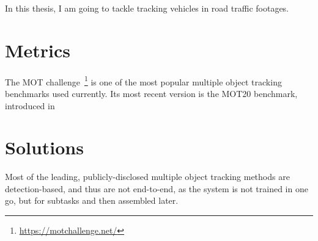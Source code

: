 In this thesis, I am going to tackle tracking vehicles in road traffic footages.

\section{Metrics}

The MOT challenge~\footnote{\url{https://motchallenge.net/}} is one of the most popular multiple object tracking  benchmarks used currently. Its most recent version is the MOT20 benchmark, introduced in   

\section{Solutions}

Most of the leading, publicly-disclosed multiple object tracking methods are detection-based, and thus are not end-to-end, as the system is not trained in one go, but for subtasks and then assembled later.